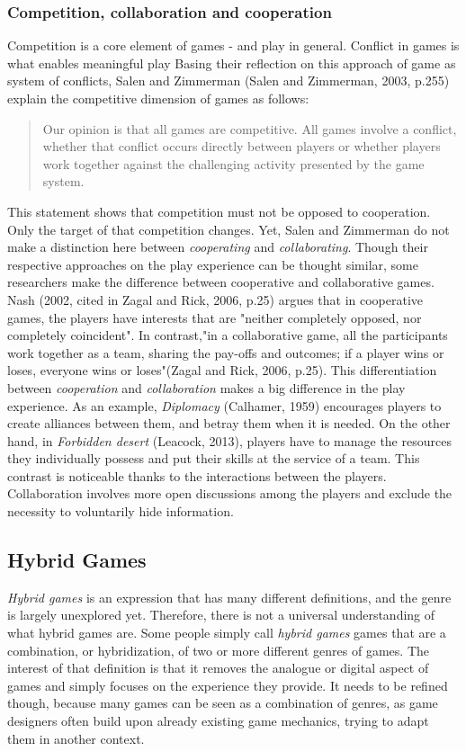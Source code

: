 \subsubsection{Competition, collaboration and cooperation}
Competition is a core element of games - and play in general. Conflict in games is what enables meaningful play Basing their reflection on this approach of game as system of conflicts, Salen and Zimmerman (Salen and Zimmerman, 2003, p.255)\cite{book:rop} explain the competitive dimension of games as follows:
\begin{quotation}
Our opinion is that all games are competitive. All games involve a conflict, whether that conflict occurs directly between players or whether players work together against the challenging activity presented by the game system.
\end{quotation}
This statement shows that competition must not be opposed to cooperation. Only the target of that competition changes. Yet, Salen and Zimmerman do not make a distinction here between \textit{cooperating} and \textit{collaborating}. Though their respective approaches on the play experience can be thought similar, some researchers make the difference between cooperative and collaborative games. Nash (2002, cited in Zagal and Rick, 2006, p.25)\cite{art:collab} argues that in cooperative games, the players have interests that are "neither completely opposed, nor completely coincident". In contrast,"in a collaborative game, all the participants work together as a team, sharing the pay-offs and outcomes; if a player wins or loses, everyone wins or loses"(Zagal and Rick, 2006, p.25). This differentiation between \textit{cooperation} and \textit{collaboration} makes a big difference in the play experience. As an example, \textit{Diplomacy} (Calhamer, 1959)\cite{game:diplo} encourages players to create alliances between them, and betray them when it is needed. On the other hand, in \textit{Forbidden desert} (Leacock, 2013)\cite{game:desert}, players have to manage the resources they individually possess and put their skills at the service of a team. 
This contrast is noticeable thanks to the interactions between the players. Collaboration involves more open discussions among the players and exclude the necessity to voluntarily hide information.


\subsection{Hybrid Games}
\textit{Hybrid games} is an expression that has many different definitions, and the genre is largely unexplored yet. Therefore, there is not a universal understanding of what hybrid games are. Some people simply call \textit{hybrid games} games that are a combination, or hybridization, of two or more different genres of games. The interest of that definition is that it removes the analogue or digital aspect of games and simply focuses on the experience they provide. It needs to be refined though, because many games can be seen as a combination of genres, as game designers often build upon already existing game mechanics, trying to adapt them in another context.

